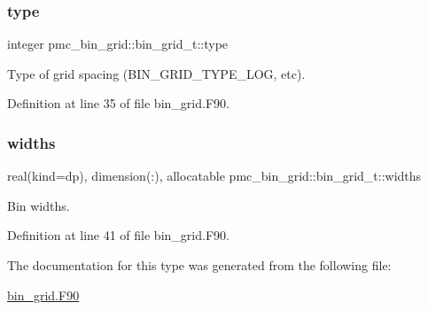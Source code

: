 \subsubsection{\texorpdfstring{type}{type}}
{\footnotesize\ttfamily integer pmc\+\_\+bin\+\_\+grid\+::bin\+\_\+grid\+\_\+t\+::type}



Type of grid spacing (B\+I\+N\+\_\+\+G\+R\+I\+D\+\_\+\+T\+Y\+P\+E\+\_\+\+L\+OG, etc). 



Definition at line 35 of file bin\+\_\+grid.\+F90.

\mbox{\label{structpmc__bin__grid_1_1bin__grid__t_a28a0f3561d58a8277b506bb3cb67616c}} 
\subsubsection{\texorpdfstring{widths}{widths}}
{\footnotesize\ttfamily real(kind=dp), dimension(\+:), allocatable pmc\+\_\+bin\+\_\+grid\+::bin\+\_\+grid\+\_\+t\+::widths}



Bin widths. 



Definition at line 41 of file bin\+\_\+grid.\+F90.



The documentation for this type was generated from the following file\+:\begin{DoxyCompactItemize}
\item 
\mbox{\hyperlink{bin__grid_8_f90}{bin\+\_\+grid.\+F90}}\end{DoxyCompactItemize}
